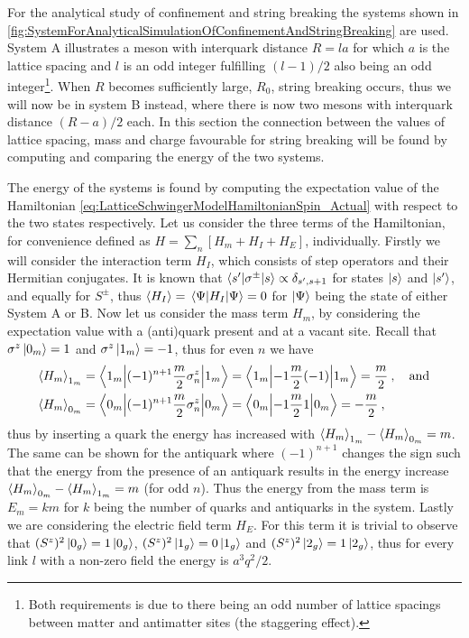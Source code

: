 \documentclass[../main.tex]{subfiles} %
\begin{document}
For the analytical study of confinement and string breaking the systems shown in \cref{fig:SystemForAnalyticalSimulationOfConfinementAndStringBreaking} are used. System A illustrates a meson with interquark distance $R = la$ for which $a$ is the lattice spacing and $l$ is an odd integer fulfilling $(l-1)/2$ also being an odd integer\footnote{Both requirements is due to there being an odd number of lattice spacings between matter and antimatter sites (the staggering effect).}. When $R$ becomes sufficiently large, $R_0$, string breaking occurs, thus we will now be in system B instead, where there is now two mesons with interquark distance $(R-a)/2$ each. In this section the connection between the values of lattice spacing, mass and charge favourable for string breaking will be found by computing and comparing the energy of the two systems.

The energy of the systems is found by computing the expectation value of the Hamiltonian \cref{eq:LatticeSchwingerModelHamiltonianSpin_Actual} with respect to the two states respectively. Let us consider the three terms of the Hamiltonian, for convenience defined as $H = \sum_n \left[ H_m + H_I + H_E \right]$, individually. Firstly we will consider the interaction term $H_I$, which consists of step operators and their Hermitian conjugates. It is known that $\mel**{s'}{\sigma^\pm}{s} \propto \delta_{s',s+1}$ for states $\ket{s}$ and $\ket{s'}$, and equally for $S^\pm$, thus $\expval{H_I} = \expval{H_I}{\Psi} = 0$ for $\ket{\Psi}$ being the state of either System A or B.
Now let us consider the mass term $H_m$, by considering the expectation value with a (anti)quark present and at a vacant site. Recall that $\sigma^z\ket{0_m} = 1$ and $\sigma^z\ket{1_m} = -1$, thus for even $n$ we have
\begin{align}
\begin{split}
    \expval{H_m}_{1_m} &= \mel**{1_m}{(-1)^{n+1} \frac{m}{2} \sigma_n^z}{1_m}
        = \mel**{1_m}{-1 \frac{m}{2} (-1)}{1_m}
        = \frac{m}{2} \: ,
    \quad \text{and} \\
    \expval{H_m}_{0_m} &= \mel**{0_m}{(-1)^{n+1} \frac{m}{2} \sigma_n^z}{0_m}
        = \mel**{0_m}{-1 \frac{m}{2} 1}{0_m}
        = -\frac{m}{2} \: ,
\end{split}
\end{align}
thus by inserting a quark the energy has increased with $\expval{H_m}_{1_m} - \expval{H_m}_{0_m} = m$. The same can be shown for the antiquark where $(-1)^{n+1}$ changes the sign such that the energy from the presence of an antiquark results in the energy increase $\expval{H_m}_{0_m} - \expval{H_m}_{1_m} = m$ (for odd $n$). Thus the energy from the mass term is $E_m = km$ for $k$ being the number of quarks and antiquarks in the system.
Lastly we are considering the electric field term $H_E$. For this term it is trivial to observe that $(S^z)^2\ket{0_g} = 1\ket{0_g}$, $(S^z)^2\ket{1_g} = 0 \ket{1_g}$ and $(S^z)^2\ket{2_g} = 1\ket{2_g}$, thus for every link $l$ with a non-zero field the energy is $a^3 q^2 / 2$.
\end{document}
